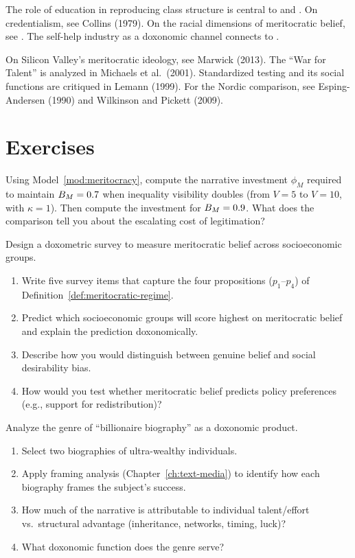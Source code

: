 The role of education in reproducing class structure is central to \textcite{bourdieu1984} and \textcite{bowles1976}.
On credentialism, see Collins (1979).
On the racial dimensions of meritocratic belief, see \textcite{hochschild2016}.
The self-help industry as a doxonomic channel connects to \textcite{ehrenreich2009}.

On Silicon Valley's meritocratic ideology, see Marwick (2013).
The ``War for Talent'' is analyzed in Michaels et al.\ (2001).
Standardized testing and its social functions are critiqued in Lemann (1999).
For the Nordic comparison, see Esping-Andersen (1990) and Wilkinson and Pickett (2009).

\section{Exercises}

\begin{exercise}
Using Model~\ref{mod:meritocracy}, compute the narrative investment $\phi_M$ required to maintain $B_{M} = 0.7$ when inequality visibility doubles (from $V = 5$ to $V = 10$, with $\kappa = 1$).
Then compute the investment for $B_{M} = 0.9$.
What does the comparison tell you about the escalating cost of legitimation?
\end{exercise}

\begin{exercise}
Design a doxometric survey to measure meritocratic belief across socioeconomic groups.
\begin{enumerate}[nosep]
  \item Write five survey items that capture the four propositions ($p_1$--$p_4$) of Definition~\ref{def:meritocratic-regime}.
  \item Predict which socioeconomic groups will score highest on meritocratic belief and explain the prediction doxonomically.
  \item Describe how you would distinguish between genuine belief and social desirability bias.
  \item How would you test whether meritocratic belief predicts policy preferences (e.g., support for redistribution)?
\end{enumerate}
\end{exercise}

\begin{exercise}
Analyze the genre of ``billionaire biography'' as a doxonomic product.
\begin{enumerate}[nosep]
  \item Select two biographies of ultra-wealthy individuals.
  \item Apply framing analysis (Chapter~\ref{ch:text-media}) to identify how each biography frames the subject's success.
  \item How much of the narrative is attributable to individual talent/effort vs.\ structural advantage (inheritance, networks, timing, luck)?
  \item What doxonomic function does the genre serve?
\end{enumerate}
\end{exercise}

